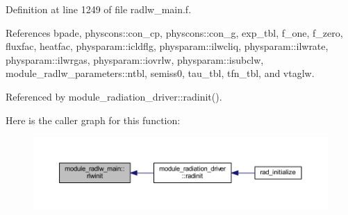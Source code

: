 Definition at line 1249 of file radlw\+\_\+main.\+f.



References bpade, physcons\+::con\+\_\+cp, physcons\+::con\+\_\+g, exp\+\_\+tbl, f\+\_\+one, f\+\_\+zero, fluxfac, heatfac, physparam\+::icldflg, physparam\+::ilwcliq, physparam\+::ilwrate, physparam\+::ilwrgas, physparam\+::iovrlw, physparam\+::isubclw, module\+\_\+radlw\+\_\+parameters\+::ntbl, semiss0, tau\+\_\+tbl, tfn\+\_\+tbl, and vtaglw.



Referenced by module\+\_\+radiation\+\_\+driver\+::radinit().



Here is the caller graph for this function\+:\nopagebreak
\begin{figure}[H]
\begin{center}
\leavevmode
\includegraphics[width=350pt]{namespacemodule__radlw__main_ad1f036ae760a7e9dcbbdd93492617bb3_icgraph}
\end{center}
\end{figure}


